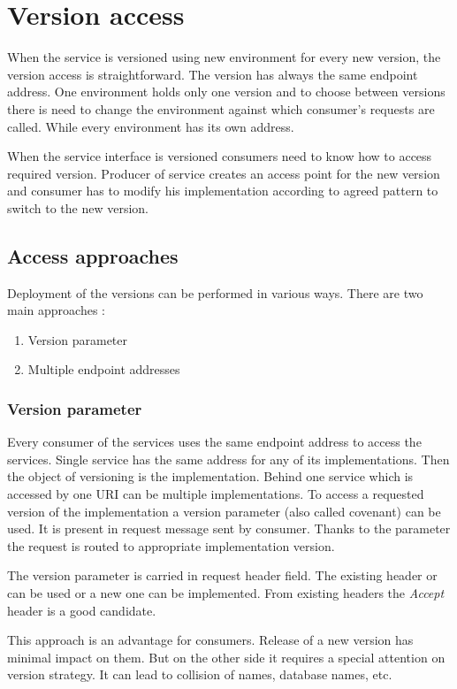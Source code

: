 \chapter{Version access}
\label{chap:versionaccess}

When the service is versioned using new environment for every new version, the version access is straightforward. The version has always the same endpoint address. One environment holds only one version and to choose between versions there is need to change the environment against which consumer's requests are called. While every environment has its own address.

When the service interface is versioned consumers need to know how to access required version. Producer of service creates an access point for the new version and consumer has to modify his implementation according to agreed pattern to switch to the new version. 

\section{Access approaches}
Deployment of the versions can be performed in various ways. There are two main approaches \cite{applied-soa}:
\begin{enumerate}
  \item Version parameter
  \item Multiple endpoint addresses
\end{enumerate}

\subsection{Version parameter}
Every consumer of the services uses the same endpoint address to access the services. Single service has the same address for any of its implementations. Then the object of versioning is the implementation. Behind one service which is accessed by one URI can be multiple implementations.
To access a requested version of the implementation a version parameter (also called covenant) can be used. It is present in request message sent by consumer. Thanks to the parameter the request is routed to appropriate implementation version.


The version parameter is carried in request header field. The existing header or can be used or a new one can be implemented. From existing headers the \emph{Accept} header is a good candidate.


This approach is an advantage for consumers. Release of a new version has minimal impact on them. But on the other side it requires a special attention on version strategy. It can lead to collision of names, database names, etc.


